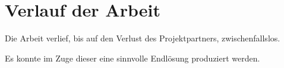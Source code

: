 \chapter{Verlauf der Arbeit}

Die Arbeit verlief, bis auf den Verlust des Projektpartners, zwischenfallslos.

Es konnte im Zuge dieser eine sinnvolle Endlösung produziert werden.

